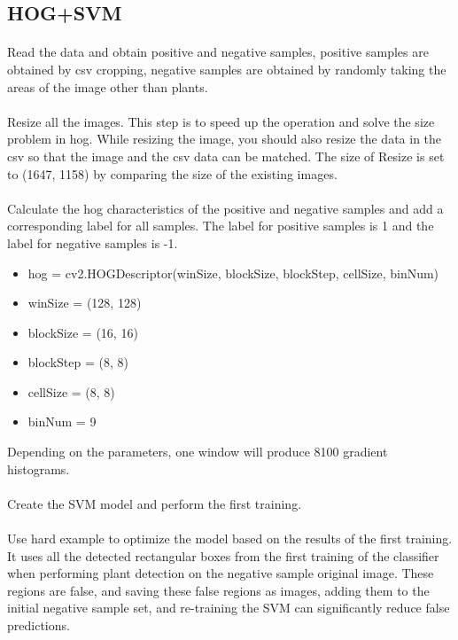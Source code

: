 \documentclass[conference]{IEEEtran}
\begin{document}
\subsection{HOG+SVM}
\paragraph{}Read the data and obtain positive and negative samples, positive samples are obtained by csv cropping, negative samples are obtained by randomly taking the areas of the image other than plants.
\paragraph{}Resize all the images. This step is to speed up the operation and solve the size problem in hog. While resizing the image, you should also resize the data in the csv so that the image and the csv data can be matched. The size of Resize is set to (1647, 1158) by comparing the size of the existing images.
\paragraph{}Calculate the hog characteristics of the positive and negative samples and add a corresponding label for all samples. The label for positive samples is 1 and the label for negative samples is -1.

\begin{itemize}
\item hog = cv2.HOGDescriptor(winSize, blockSize, blockStep, cellSize, binNum)
\item winSize = (128, 128)
\item blockSize = (16, 16)
\item blockStep = (8, 8)
\item cellSize = (8, 8)
\item binNum = 9 
\end{itemize}

Depending on the parameters, one window will produce 8100 gradient histograms.
\paragraph{}Create the SVM model and perform the first training.
\paragraph{}Use hard example to optimize the model based on the results of the first training. It uses all the detected rectangular boxes from the first training of the classifier when performing plant detection on the negative sample original image. These regions are false, and saving these false regions as images, adding them to the initial negative sample set, and re-training the SVM can significantly reduce false predictions.
\end{document}
